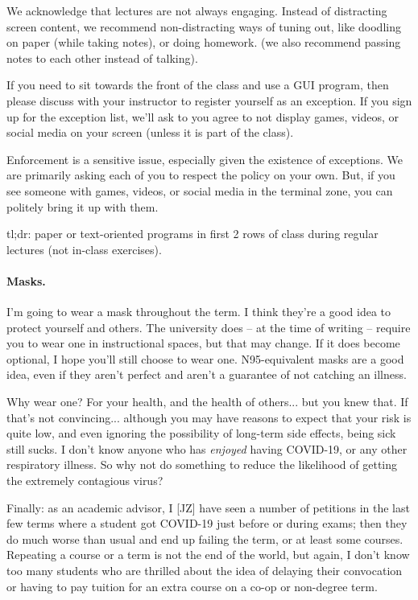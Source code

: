 We acknowledge that lectures are not always engaging. Instead of
distracting screen content, we recommend non-distracting ways of tuning
out, like doodling on paper (while taking notes), or doing homework.
(we also recommend passing notes to each other instead of talking).

If you need to sit towards the front of the class and use a GUI
program, then please discuss with your instructor to register
yourself as an exception. If you sign up for
the exception list, we'll ask to you agree to not display games,
videos, or social media on your screen (unless it is part of the
class).

Enforcement is a sensitive issue, especially given the existence of
exceptions. We are primarily asking each of you to respect the policy
on your own. But, if you see someone with games, videos, or social
media in the terminal zone, you can politely bring it up with them.

tl;dr: paper or text-oriented programs in first 2 rows of class during regular lectures (not in-class exercises).

\paragraph{Masks.}

I'm going to wear a mask throughout the term. I think they're a good idea to protect yourself and others. The university does -- at the time of writing -- require you to wear one in instructional spaces, but that may change. If it does become optional, I hope you'll still choose to wear one. N95-equivalent masks are a good idea, even if they aren't perfect and aren't a guarantee of not catching an illness. 

Why wear one? For your health, and the health of others... but you knew that. If that's not convincing... although you may have reasons to expect that your risk is quite low, and even ignoring the possibility of long-term side effects, being sick still sucks. I don't know anyone who has \textit{enjoyed} having COVID-19, or any other respiratory illness. So why not do something to reduce the likelihood of getting the extremely contagious virus?

Finally: as an academic advisor, I [JZ] have seen a number of petitions in the last few terms where a student got COVID-19 just before or during exams; then they do much worse than usual and end up failing the term, or at least some courses. Repeating a course or a term is not the end of the world, but again, I don't know too many students who are thrilled about the idea of delaying their convocation or having to pay tuition for an extra course on a co-op or non-degree term.


